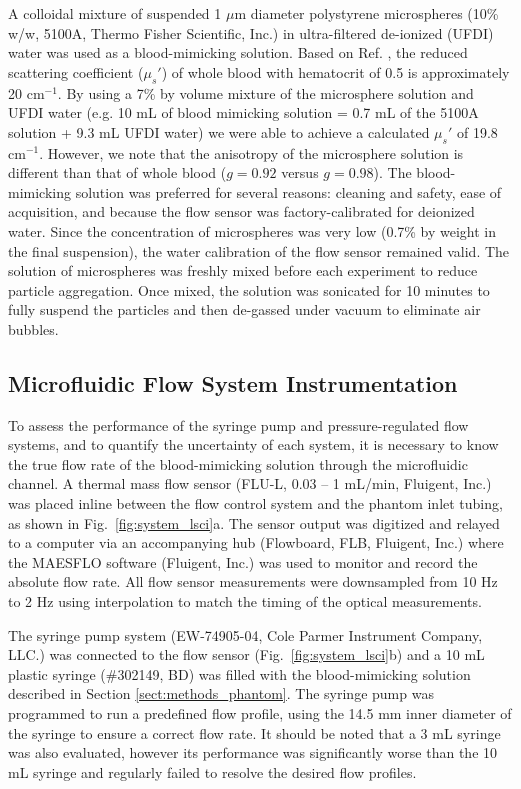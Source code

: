 \documentclass[12pt]{spieman}
\begin{document}
\begin{spacing}{2}
A colloidal mixture of suspended 1 $\mu$m diameter polystyrene microspheres (10\% w/w, 5100A, Thermo Fisher Scientific, Inc.) in ultra-filtered de-ionized (UFDI) water was used as a blood-mimicking solution. Based on Ref. \cite[]{Roggan:1999bz}, the reduced scattering coefficient ($\mu_s'$) of whole blood with hematocrit of 0.5 is approximately 20 cm$^{-1}$. By using a 7\% by volume mixture of the microsphere solution and UFDI water (e.g. 10 mL of blood mimicking solution = 0.7 mL of the 5100A solution + 9.3 mL UFDI water) we were able to achieve a calculated $\mu_s'$ of 19.8 cm$^{-1}$. However, we note that the anisotropy of the microsphere solution is different than that of whole blood ($g = 0.92$ versus $g = 0.98$). The blood-mimicking solution was preferred for several reasons: cleaning and safety, ease of acquisition, and because the flow sensor was factory-calibrated for deionized water. Since the concentration of microspheres was very low (0.7\% by weight in the final suspension), the water calibration of the flow sensor remained valid. The solution of microspheres was freshly mixed before each experiment to reduce particle aggregation. Once mixed, the solution was sonicated for 10 minutes to fully suspend the particles and then de-gassed under vacuum to eliminate air bubbles.


\subsection{Microfluidic Flow System Instrumentation}

To assess the performance of the syringe pump and pressure-regulated flow systems, and to quantify the uncertainty of each system, it is necessary to know the true flow rate of the blood-mimicking solution through the microfluidic channel. A thermal mass flow sensor (FLU-L, 0.03 -- 1 mL/min, Fluigent, Inc.) was placed inline between the flow control system and the phantom inlet tubing, as shown in Fig.~\ref{fig:system_lsci}a. The sensor output was digitized and relayed to a computer via an accompanying hub (Flowboard, FLB, Fluigent, Inc.) where the MAESFLO software (Fluigent, Inc.) was used to monitor and record the absolute flow rate. All flow sensor measurements were downsampled from 10 Hz to 2 Hz using interpolation to match the timing of the optical measurements.

The syringe pump system (EW-74905-04, Cole Parmer Instrument Company, LLC.) was connected to the flow sensor (Fig.~\ref{fig:system_lsci}b) and a 10 mL plastic syringe (\#302149, BD) was filled with the blood-mimicking solution described in Section \ref{sect:methods_phantom}. The syringe pump was programmed to run a predefined flow profile, using the 14.5 mm inner diameter of the syringe to ensure a correct flow rate. It should be noted that a 3 mL syringe was also evaluated, however its performance was significantly worse than the 10 mL syringe and regularly failed to resolve the desired flow profiles.


\end{spacing}
\end{document}
